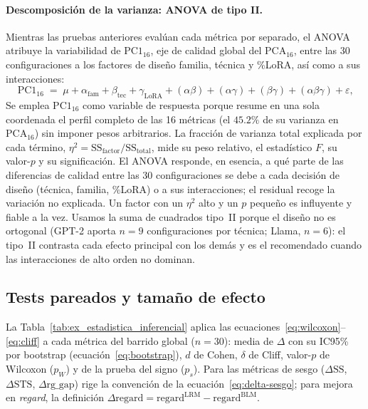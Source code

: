 \documentclass[12pt,a4paper]{report}
\newcommand{\dREG}{\ensuremath{\Delta\mathrm{regard}}}
\newcommand{\PCAsixteen}{\ensuremath{\mathrm{PCA}_{16}}}
\newcommand{\PConeSixteen}{\ensuremath{\mathrm{PC1}_{16}}}
\begin{document}
\paragraph{Descomposición de la varianza: ANOVA de tipo II.} Mientras las pruebas anteriores evalúan cada métrica por separado, el ANOVA atribuye la variabilidad de \PConeSixteen{}, eje de calidad global del \PCAsixteen{}, entre las 30 configuraciones a los factores de diseño familia, técnica y \%LoRA, así como a sus interacciones:
\begin{equation}
\PConeSixteen \;=\; \mu + \alpha_{\mathrm{fam}} + \beta_{\mathrm{tec}} + \gamma_{\mathrm{LoRA}} + (\alpha\beta) + (\alpha\gamma) + (\beta\gamma) + (\alpha\beta\gamma) + \varepsilon\text{,}
\label{eq:anova}
\end{equation}
Se emplea \PConeSixteen{} como variable de respuesta porque resume en una sola coordenada el perfil completo de las 16 métricas (el $45.2\%$ de su varianza en \PCAsixteen{}) sin imponer pesos arbitrarios. La fracción de varianza total explicada por cada término, $\eta^2=\mathrm{SS}_{\text{factor}}/\mathrm{SS}_{\text{total}}$, mide su peso relativo, el estadístico $F$, su valor-$p$ y su significación. El ANOVA responde, en esencia, a qué parte de las diferencias de calidad entre las 30 configuraciones se debe a cada decisión de diseño (técnica, familia, \%LoRA) o a sus interacciones; el residual recoge la variación no explicada. Un factor con un $\eta^2$ alto y un $p$ pequeño es influyente y fiable a la vez. Usamos la suma de cuadrados tipo~II porque el diseño no es ortogonal (GPT-2 aporta $n=9$ configuraciones por técnica; Llama, $n=6$): el tipo~II contrasta cada efecto principal con los demás y es el recomendado cuando las interacciones de alto orden no dominan.

\subsection{Tests pareados y tamaño de efecto}
\label{subsec:ex_tests}

La Tabla~\ref{tab:ex_estadistica_inferencial} aplica las ecuaciones~\eqref{eq:wilcoxon}--\eqref{eq:cliff} a cada métrica del barrido global ($n=30$): media de $\Delta$ con su IC95\% por bootstrap (ecuación~\eqref{eq:bootstrap}), $d$ de Cohen, $\delta$ de Cliff, valor-$p$ de Wilcoxon ($p_W$) y de la prueba del signo ($p_s$). Para las métricas de sesgo ($\Delta\mathrm{SS}$, $\Delta\mathrm{STS}$, $\Delta\mathrm{rg\_gap}$) rige la convención de la ecuación~\eqref{eq:delta-sesgo}; para mejora en \textit{regard}, la definición $\dREG=\mathrm{regard}^{\mathrm{LRM}}-\mathrm{regard}^{\mathrm{BLM}}$.
\end{document}
